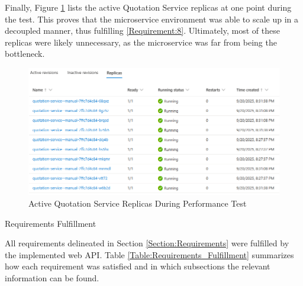 \documentclass[12pt, reqno]{amsbook}
\makeatletter
\def\section{\@startsection{section}{1}%
      \z@{.5\linespacing\@plus.7\linespacing}{.25\linespacing}%
      {\normalfont\bfseries\flushleft}}
\theoremstyle{definition}
\theoremstyle{definition}
\numberwithin{section}{chapter}
\numberwithin{table}{chapter}
\numberwithin{figure}{chapter}
\makeatother
\begin{document}
Finally, Figure \ref{Figure:LoadTestingActiveReplicas} lists the active Quotation Service replicas at one point during the test. This proves that the microservice environment was able to scale up in a decoupled manner, thus fulfilling \ref{Requirement:8}. Ultimately, most of these replicas were likely unnecessary, as the microservice was far from being the bottleneck.

\begin{figure}[H]
  \centering
  \includegraphics[width=1\linewidth]{images/LoadTestingActiveReplicas.png}
  \caption{\label{Figure:LoadTestingActiveReplicas}Active Quotation Service Replicas During Performance Test}
\end{figure}

\section{Requirements Fulfillment}
\label{Section:Requirements_Fulfillment}

All requirements delineated in Section \ref{Section:Requirements} were fulfilled by the implemented web \ac{API}. Table \ref{Table:Requirements_Fulfillment} summarizes how each requirement was satisfied and in which subsections the relevant information can be found.
\end{document}

